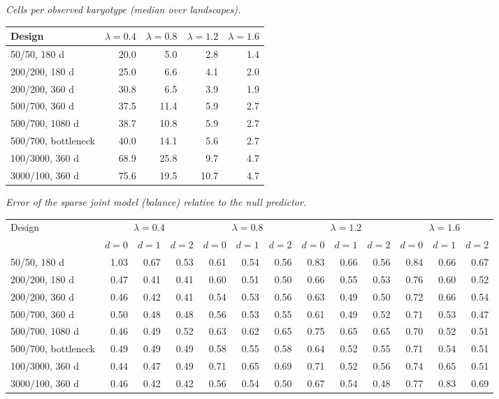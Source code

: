 \noindent\textit{Cells per observed karyotype (median over landscapes).}
\begin{center}
\footnotesize
\setlength{\tabcolsep}{3pt}
\begin{tabular}{lrrrr}
\toprule
Design & $\lambda=0.4$ & $\lambda=0.8$ & $\lambda=1.2$ & $\lambda=1.6$ \\
\midrule
50/50, 180 d & 20.0 & 5.0 & 2.8 & 1.4 \\
200/200, 180 d & 25.0 & 6.6 & 4.1 & 2.0 \\
200/200, 360 d & 30.8 & 6.5 & 3.9 & 1.9 \\
500/700, 360 d & 37.5 & 11.4 & 5.9 & 2.7 \\
500/700, 1080 d & 38.7 & 10.8 & 5.9 & 2.7 \\
500/700, bottleneck & 40.0 & 14.1 & 5.6 & 2.7 \\
100/3000, 360 d & 68.9 & 25.8 & 9.7 & 4.7 \\
3000/100, 360 d & 75.6 & 19.5 & 10.7 & 4.7 \\
\bottomrule
\end{tabular}
\end{center}

\noindent\textit{Error of the sparse joint model (balance) relative to the null predictor.}
\begin{center}
\footnotesize
\setlength{\tabcolsep}{3pt}
\begin{tabular}{l*{12}{r}}
\toprule
Design & \multicolumn{3}{c}{$\lambda=0.4$} & \multicolumn{3}{c}{$\lambda=0.8$} & \multicolumn{3}{c}{$\lambda=1.2$} & \multicolumn{3}{c}{$\lambda=1.6$} \\
\cmidrule(lr){2-4}\cmidrule(lr){5-7}\cmidrule(lr){8-10}\cmidrule(lr){11-13}
 & $d=0$ & $d=1$ & $d=2$ & $d=0$ & $d=1$ & $d=2$ & $d=0$ & $d=1$ & $d=2$ & $d=0$ & $d=1$ & $d=2$ \\
\midrule
50/50, 180 d & 1.03 & 0.67 & 0.53 & 0.61 & 0.54 & 0.56 & 0.83 & 0.66 & 0.56 & 0.84 & 0.66 & 0.67 \\
200/200, 180 d & 0.47 & 0.41 & 0.41 & 0.60 & 0.51 & 0.50 & 0.66 & 0.55 & 0.53 & 0.76 & 0.60 & 0.52 \\
200/200, 360 d & 0.46 & 0.42 & 0.41 & 0.54 & 0.53 & 0.56 & 0.63 & 0.49 & 0.50 & 0.72 & 0.66 & 0.54 \\
500/700, 360 d & 0.50 & 0.48 & 0.48 & 0.56 & 0.53 & 0.55 & 0.61 & 0.49 & 0.52 & 0.71 & 0.53 & 0.47 \\
500/700, 1080 d & 0.46 & 0.49 & 0.52 & 0.63 & 0.62 & 0.65 & 0.75 & 0.65 & 0.65 & 0.70 & 0.52 & 0.51 \\
500/700, bottleneck & 0.49 & 0.49 & 0.49 & 0.58 & 0.55 & 0.58 & 0.64 & 0.52 & 0.55 & 0.71 & 0.54 & 0.51 \\
100/3000, 360 d & 0.44 & 0.47 & 0.49 & 0.71 & 0.65 & 0.69 & 0.71 & 0.52 & 0.56 & 0.74 & 0.65 & 0.51 \\
3000/100, 360 d & 0.46 & 0.42 & 0.42 & 0.56 & 0.54 & 0.50 & 0.67 & 0.54 & 0.48 & 0.77 & 0.83 & 0.69 \\
\bottomrule
\end{tabular}
\end{center}

